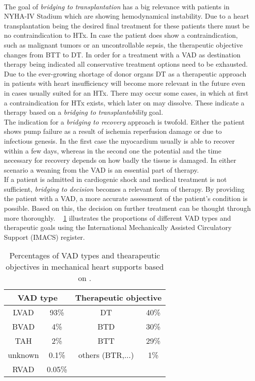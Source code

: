 \\The goal of \textit{bridging to transplantation} has a big relevance with patients in NYHA-IV Stadium which are showing hemodynamical instability. Due to a heart transplantation being the desired final treatment for these patients there must be no contraindication to HTx. In case the patient does show a contraindication, such as malignant tumors or an uncontrollable sepsis, the therapeutic objective changes from BTT to DT. In order for a treatment with a VAD as destination therapy being indicated all conservative treatment options need to be exhausted. Due to the ever-growing shortage of donor organs DT as a therapeutic approach in patients with heart insufficiency will become more relevant in the future even in cases usually suited for an HTx. \cite{VAD7} There may occur some cases, in which at first a contraindication for HTx exists, which later on may dissolve. These indicate a therapy based on a \textit{bridging to transplantability} goal. \cite{VAD6}
\\The indication for a \textit{bridging to recovery} approach is twofold. Either the patient shows pump failure as a result of ischemia reperfusion damage or due to infectious genesis. In the first case the myocardium usually is able to recover within a few days, whereas in the second one the potential and the time necessary for recovery depends on how badly the tissue is damaged. In either scenario a weaning from the VAD is an essential part of therapy. \cite{VAD7}
\\If a patient is admitted in cardiogenic shock and medical treatment is not sufficient, \textit{bridging to decision} becomes a relevant form of therapy. By providing the patient with a VAD, a more accurate assessment of the patient's condition is possible.
Based on this, the decision on further treatment can be thought through more thoroughly. \cite{VAD6} \tablename~ \ref{tab:Table2} illustrates the proportions of different VAD types and therapeutic goals using the International Mechanically Assisted Circulatory Support (IMACS) register.
\begin{table}
  \centering
  \begin{tabular}{cc|cc}
    \toprule
    \multicolumn{2}{c|}{VAD type} &
    \multicolumn{2}{c}{Therapeutic objective} \\
    \midrule
    LVAD & 93\% & DT & 40\%\\
    BVAD & 4\% & BTD & 30\%\\
    TAH & 2\% & BTT & 29\%\\
    unknown & 0.1\% & others (BTR,...) & 1\%\\
    RVAD & 0.05\% & &\\
    \bottomrule
\end{tabular}
  \caption{Percentages of VAD types and thearapeutic objectives in mechanical heart supports based on \cite{VAD7}.}
  \label{tab:Table2}
\end{table}

